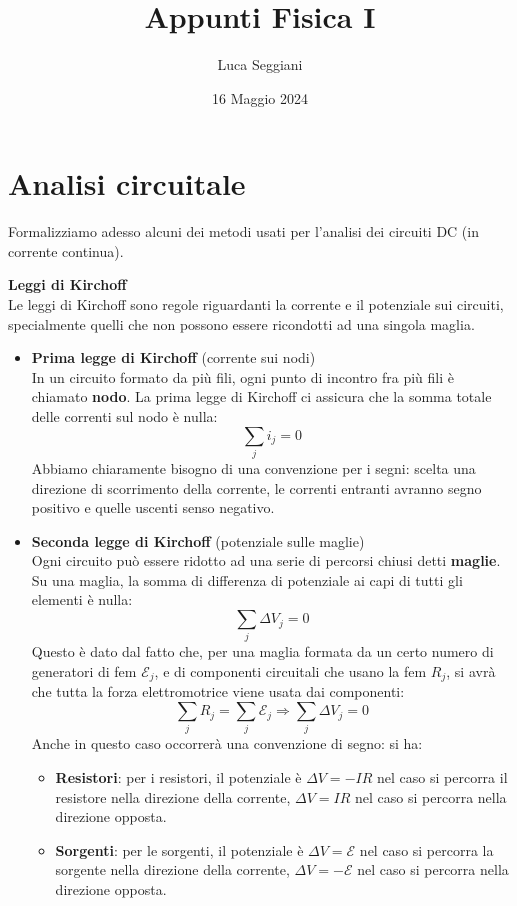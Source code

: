 \documentclass[a4paper,12pt]{article}
\title{Appunti Fisica I}
\author{Luca Seggiani}
\date{16 Maggio 2024}
\begin{document}
\maketitle
\section{Analisi circuitale}
Formalizziamo adesso alcuni dei metodi usati per l'analisi dei circuiti DC (in corrente continua).
\par\smallskip
\textbf{Leggi di Kirchoff} \\
Le leggi di Kirchoff sono regole riguardanti la corrente e il potenziale sui circuiti, specialmente quelli che non possono essere ricondotti ad una singola maglia.
\begin{itemize}
  \item \textbf{Prima legge di Kirchoff} (corrente sui nodi) \\
    In un circuito formato da più fili, ogni punto di incontro fra più fili è chiamato \textbf{nodo}. La prima legge di Kirchoff
    ci assicura che la somma totale delle correnti sul nodo è nulla:
    $$ \sum_j i_j = 0 $$
    Abbiamo chiaramente bisogno di una convenzione per i segni: scelta una direzione di scorrimento della corrente,
    le correnti entranti avranno segno positivo e quelle uscenti senso negativo.
  \item \textbf{Seconda legge di Kirchoff} (potenziale sulle maglie) \\
    Ogni circuito può essere ridotto ad una serie di percorsi chiusi detti \textbf{maglie}. Su una maglia, la somma di differenza
    di potenziale ai capi di tutti gli elementi è nulla:
    $$ \sum_j \Delta V_j = 0 $$
    Questo è dato dal fatto che, per una maglia formata da un certo numero di generatori di fem $\mathcal{E}_j$, e di componenti circuitali che
    usano la fem $R_j$, si avrà che tutta la forza elettromotrice viene usata dai componenti:
    $$ \sum_j R_j = \sum_j \mathcal{E}_j \Rightarrow \sum_j \Delta V_j = 0 $$
    Anche in questo caso occorrerà una convenzione di segno: si ha:
    \begin{itemize}
      \item \textbf{Resistori}: per i resistori, il potenziale è $\Delta V = -IR$ nel caso si percorra il resistore
        nella direzione della corrente, $\Delta V = IR$ nel caso si percorra nella direzione opposta.
      \item \textbf{Sorgenti}: per le sorgenti, il potenziale è $\Delta V = \mathcal{E}$ nel caso si percorra la
        sorgente nella direzione della corrente, $\Delta V = -\mathcal{E}$ nel caso si percorra nella direzione opposta.
    \end{itemize}
\end{itemize}
\end{document}
